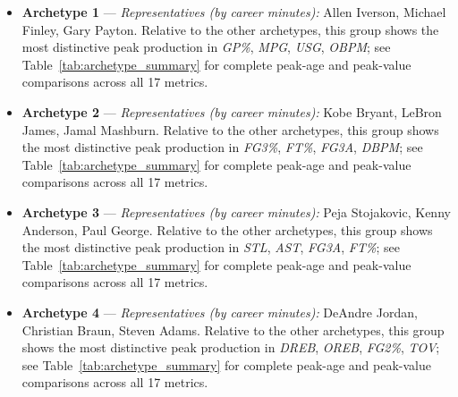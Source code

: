 \begin{itemize}
\item \textbf{Archetype 1} --- \emph{Representatives (by career minutes):} Allen Iverson, Michael Finley, Gary Payton. Relative to the other archetypes, this group shows the most distinctive peak production in \textit{GP\%}, \textit{MPG}, \textit{USG}, \textit{OBPM}; see Table~\ref{tab:archetype_summary} for complete peak-age and peak-value comparisons across all 17 metrics.
\item \textbf{Archetype 2} --- \emph{Representatives (by career minutes):} Kobe Bryant, LeBron James, Jamal Mashburn. Relative to the other archetypes, this group shows the most distinctive peak production in \textit{FG3\%}, \textit{FT\%}, \textit{FG3A}, \textit{DBPM}; see Table~\ref{tab:archetype_summary} for complete peak-age and peak-value comparisons across all 17 metrics.
\item \textbf{Archetype 3} --- \emph{Representatives (by career minutes):} Peja Stojakovic, Kenny Anderson, Paul George. Relative to the other archetypes, this group shows the most distinctive peak production in \textit{STL}, \textit{AST}, \textit{FG3A}, \textit{FT\%}; see Table~\ref{tab:archetype_summary} for complete peak-age and peak-value comparisons across all 17 metrics.
\item \textbf{Archetype 4} --- \emph{Representatives (by career minutes):} DeAndre Jordan, Christian Braun, Steven Adams. Relative to the other archetypes, this group shows the most distinctive peak production in \textit{DREB}, \textit{OREB}, \textit{FG2\%}, \textit{TOV}; see Table~\ref{tab:archetype_summary} for complete peak-age and peak-value comparisons across all 17 metrics.
\end{itemize}
